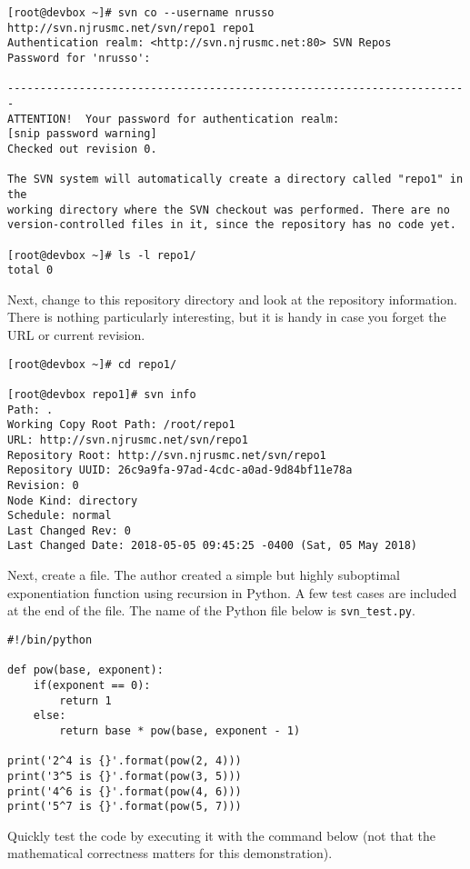 \begin{verbatim}
[root@devbox ~]# svn co --username nrusso http://svn.njrusmc.net/svn/repo1 repo1
Authentication realm: <http://svn.njrusmc.net:80> SVN Repos
Password for 'nrusso': 

-----------------------------------------------------------------------
ATTENTION!  Your password for authentication realm:
[snip password warning]
Checked out revision 0.

The SVN system will automatically create a directory called "repo1" in the
working directory where the SVN checkout was performed. There are no
version-controlled files in it, since the repository has no code yet.

[root@devbox ~]# ls -l repo1/
total 0
\end{verbatim}

Next, change to this repository directory and look at the repository
information. There is nothing particularly interesting, but it is handy in
case you forget the URL or current revision.

\begin{verbatim}
[root@devbox ~]# cd repo1/

[root@devbox repo1]# svn info
Path: .
Working Copy Root Path: /root/repo1
URL: http://svn.njrusmc.net/svn/repo1
Repository Root: http://svn.njrusmc.net/svn/repo1
Repository UUID: 26c9a9fa-97ad-4cdc-a0ad-9d84bf11e78a
Revision: 0
Node Kind: directory
Schedule: normal
Last Changed Rev: 0
Last Changed Date: 2018-05-05 09:45:25 -0400 (Sat, 05 May 2018)
\end{verbatim}

Next, create a file. The author created a simple but highly suboptimal
exponentiation function using recursion in Python. A few test cases are
included at the end of the file. The name of the Python file below is
\verb|svn_test.py|.

\begin{verbatim}
#!/bin/python

def pow(base, exponent):
    if(exponent == 0):
        return 1
    else:
        return base * pow(base, exponent - 1)

print('2^4 is {}'.format(pow(2, 4)))
print('3^5 is {}'.format(pow(3, 5)))
print('4^6 is {}'.format(pow(4, 6)))
print('5^7 is {}'.format(pow(5, 7)))
\end{verbatim}

Quickly test the code by executing it with the command below (not that the
mathematical correctness matters for this demonstration).


